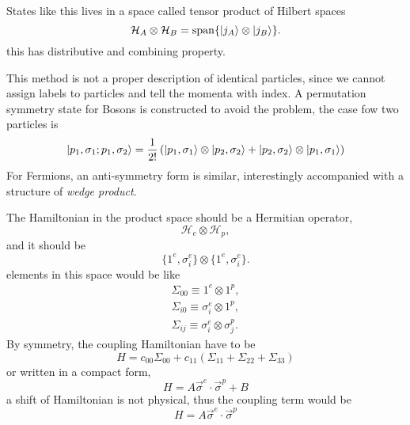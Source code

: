 States like this lives in a space called tensor product of Hilbert spaces
\begin{equation}
  \mathcal{H}_{A} \otimes \mathcal{H}_{B} = \operatorname{span} \{ \ket{j_{A}} \otimes \ket{j_{B}} \}.
\end{equation}
this has distributive and combining property.

This method is not a proper description of identical particles, since we cannot assign labels to particles and tell the momenta with index.
A permutation symmetry state for Bosons is constructed to avoid the problem, the case fow two particles is
\begin{equation}
  \ket{p_1, \sigma_1; p_1, \sigma_2} = \frac{1}{2!} \left( \ket{p_1, \sigma_1} \otimes \ket{p_2, \sigma_2} + \ket{p_2, \sigma_2} \otimes  \ket{p_1, \sigma_1} \right) 
\end{equation}
For Fermions, an anti-symmetry form is similar, interestingly accompanied with a structure of \emph{wedge product}.

The Hamiltonian in the product space should be a Hermitian operator,
\begin{equation}
  \mathcal{H}_{e} \otimes \mathcal{H}_{p},
\end{equation}
and it should be 
\begin{equation}
  \{ 1^{e}, \sigma_i^{e} \} \otimes \{ 1^{e}, \sigma_i^{e} \}.
\end{equation}
elements in this space would be like
\begin{equation}
  \begin{gathered}
    \Sigma_{00} \equiv  1^{e} \otimes 1^{p}, \\
    \Sigma_{i 0} \equiv  \sigma_{i}^{e} \otimes 1^{p}, \\
    \Sigma_{i j} \equiv  \sigma_{i}^{e} \otimes \sigma_{j}^{p}.
  \end{gathered}
\end{equation}
By symmetry, the coupling Hamiltonian have to be
\begin{equation}
  H = c_{00} \Sigma_{00} + c_{11} \left( \Sigma_{11} + \Sigma_{22} + \Sigma_{33} \right) 
\end{equation}
or written in a compact form,
\begin{equation}
  H = A \vec{\sigma}^{e} \cdot \vec{\sigma}^{p} + B
\end{equation}
a shift of Hamiltonian is not physical, thus the coupling term would be
\begin{equation}
  H = A \vec{\sigma}^{e} \cdot \vec{\sigma}^{p}
\end{equation}

